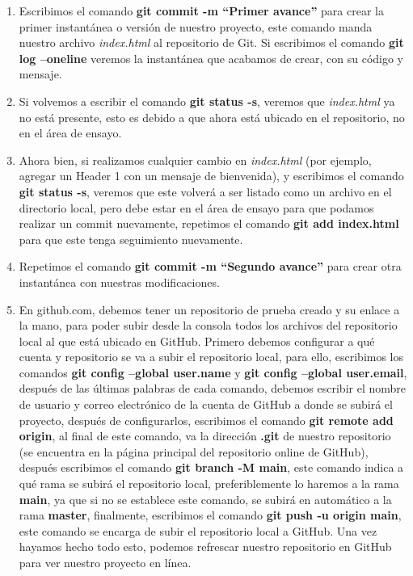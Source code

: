 \begin{enumerate}
    \item Escribimos el comando \textbf{git commit -m “Primer avance”} para crear la primer instantánea o versión de nuestro proyecto, este comando manda nuestro archivo \textit{index.html} al repositorio de Git. Si escribimos el comando \textbf{git log –oneline} veremos la instantánea que acabamos de crear, con su código y mensaje.
    \item Si volvemos a escribir el comando \textbf{git status -s}, veremos que \textit{index.html} ya no está presente, esto es debido a que ahora está ubicado en el repositorio, no en el área de ensayo.
    \item Ahora bien, si realizamos cualquier cambio en \textit{index.html} (por ejemplo, agregar un Header 1 con un mensaje de bienvenida), y escribimos el comando \textbf{git status -s}, veremos que este volverá a ser listado como un archivo en el directorio local, pero debe estar en el área de ensayo para que podamos realizar un commit nuevamente, repetimos el comando \textbf{git add index.html} para que este tenga seguimiento nuevamente.
    \item Repetimos el comando \textbf{git commit -m “Segundo avance”} para crear otra instantánea con nuestras modificaciones.
    \item En github.com, debemos tener un repositorio de prueba creado y su enlace a la mano, para poder subir desde la consola todos los archivos del repositorio local al que está ubicado en GitHub. Primero debemos configurar a qué cuenta y repositorio se va a subir el repositorio local, para ello, escribimos los comandos \textbf{git config –global user.name} y \textbf{git config –global user.email}, después de las últimas palabras de cada comando, debemos escribir el nombre de usuario y correo electrónico de la cuenta de GitHub a donde se subirá el proyecto, después de configurarlos, escribimos el comando \textbf{git remote add origin}, al final de este comando, va la dirección \textbf{.git} de nuestro repositorio (se encuentra en la página principal del repositorio online de GitHub), después escribimos el comando \textbf{git branch -M main}, este comando indica a qué rama se subirá el repositorio local, preferiblemente lo haremos a la rama \textbf{main}, ya que si no se establece este comando, se subirá en automático a la rama \textbf{master}, finalmente, escribimos el comando \textbf{git push -u origin main}, este comando se encarga de subir el repositorio local a GitHub. Una vez hayamos hecho todo esto, podemos refrescar nuestro repositorio en GitHub para ver nuestro proyecto en línea.

\end{enumerate}
